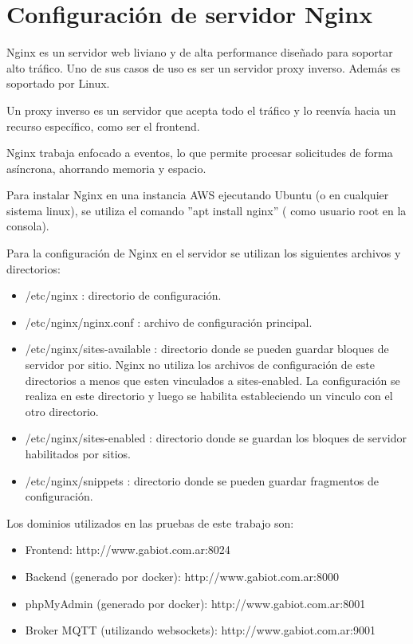 
\chapter{Configuración de servidor Nginx} %

\label{AppendixB} %

Nginx \citep{WEBSITE:36} es un servidor web liviano y de alta performance diseñado para soportar alto tráfico. Uno de sus casos de uso es ser un servidor proxy inverso. Además es soportado por Linux.

Un proxy inverso es un servidor que acepta todo el tráfico y lo reenvía hacia un recurso específico, como ser el frontend.

Nginx trabaja enfocado a eventos, lo que permite procesar solicitudes de forma asíncrona, ahorrando memoria y espacio.

Para instalar Nginx en una instancia AWS ejecutando Ubuntu (o en cualquier sistema linux), se utiliza el comando ''apt install nginx'' ( como usuario root en la consola).

Para la configuración de Nginx en el servidor se utilizan los siguientes archivos y directorios:
\begin{itemize}
\item /etc/nginx : directorio de configuración.
\item /etc/nginx/nginx.conf : archivo de configuración principal.
\item /etc/nginx/sites-available : directorio donde se pueden guardar bloques de servidor por sitio. Nginx no utiliza los archivos de configuración de este directorios a menos que esten vinculados a sites-enabled. La configuración se realiza en este directorio y luego se habilita estableciendo un vinculo con el otro directorio.
\item /etc/nginx/sites-enabled : directorio donde se guardan los bloques de servidor habilitados por sitios. 
\item /etc/nginx/snippets : directorio donde se pueden guardar fragmentos de configuración.
\end{itemize}

Los dominios utilizados en las pruebas de este trabajo son:

\begin{itemize}
\item Frontend: http://www.gabiot.com.ar:8024
\item Backend (generado por docker): http://www.gabiot.com.ar:8000
\item phpMyAdmin (generado por docker): http://www.gabiot.com.ar:8001
\item Broker MQTT (utilizando websockets): http://www.gabiot.com.ar:9001
\end{itemize}

